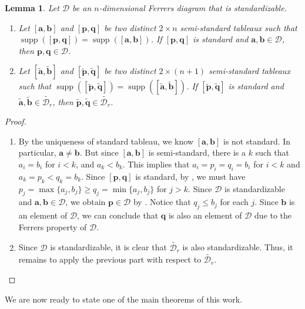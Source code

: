 \documentclass[11pt,a4paper,reqno,dvipsnames]{amsart}
\theoremstyle{plain}
\newtheorem{Lemma}[Theorem]{Lemma}
\theoremstyle{definition}
\newtheorem{Assumptions and Discussion}[Theorem]{Assumptions and Discussion}
\theoremstyle{remark}
\def\supp{\operatorname{supp}}
\newcommand\bda{{\bm a}}
\newcommand\bdb{{\bm b}}
\newcommand\bdp{{\bm p}}
\newcommand\bdq{{\bm q}}
\newcommand\calD{\mathcal{D}}
\begin{document}
\begin{Lemma}
    \label{LexClosed}
    Let $\calD$ be an $n$-dimensional Ferrers diagram that is standardizable.
    \begin{enumerate}[a]
        \item  Let $[\bda,\bdb]$ and $[\bdp,\bdq]$ be two distinct $2\times n$ semi-standard tableaux such that $\supp ([\bdp,\bdq])=\supp([\bda,\bdb])$. If $[\bdp, \bdq]$ is standard and $\bda,\bdb\in \calD$, then $\bdp,\bdq\in \calD$.
        \item  Let $[\tilde{\bda},\tilde{\bdb}]$ and $[\tilde{\bdp},\tilde{\bdq}]$ be two distinct $2\times (n+1)$ semi-standard tableaux such that $\supp ([\tilde{\bdp},\tilde{\bdq}])=\supp([\tilde{\bda},\tilde{\bdb}])$. If $[\tilde{\bdp}, \tilde{\bdq}]$ is standard and $\tilde{\bda},\tilde{\bdb}\in \widetilde{\calD_r}$, then $\tilde{\bdp},\tilde{\bdq}\in \widetilde{\calD_r}$.
    \end{enumerate}
\end{Lemma}
\begin{proof}
    \begin{enumerate}[a]
        \item By the uniqueness of standard tableau, we know $[\bda,\bdb]$ is not standard.  In particular, $\bda\ne \bdb$. But since $[\bda,\bdb]$ is semi-standard, there is a $k$ such that $a_i=b_i$ for $i<k$, and $a_k<b_k$. This implies that $a_i=p_i=q_i=b_i$ for $i<k$ and $a_k=p_k<q_k=b_k$. Since $[\bdp,\bdq]$ is standard, by , we must have $p_j=\max\{a_j,b_j\} \ge q_j=\min\{a_j,b_j\}$ for $j>k$. 
            Since $\calD$ is standardizable and $\bda,\bdb\in \calD$, we obtain $\bdp\in \calD$ by . Notice that $q_j\leq b_j$ for each $j$.
            Since $\bdb$ is an element of $\calD$, we can conclude that $\bdq$ is also an element of $\calD$ due to the Ferrers property of $\calD$.

        \item 
            Since $\calD$ is standardizable, it is clear that $\widetilde{\calD_r}$
            is also standardizable. Thus, it remains to apply the previous part with respect to $\widetilde{\calD_r}$.
            \qedhere
    \end{enumerate}
\end{proof}




We are now ready to state one of the main theorems of this work.
\end{document}
